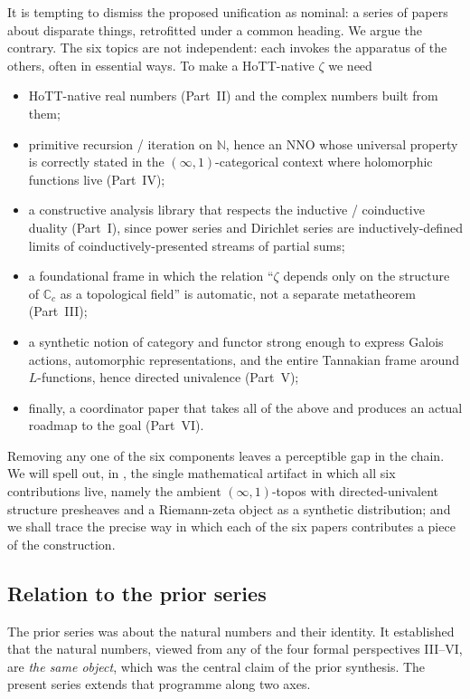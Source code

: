 \documentclass[12pt]{article}
\theoremstyle{definition}
\theoremstyle{remark}
\newcommand{\N}{\mathbb{N}}
\newcommand{\C}{\mathbb{C}}
\newcommand{\Cc}{\C_{c}}
\begin{document}
It is tempting to dismiss the proposed unification as nominal: a series of
papers about disparate things, retrofitted under a common heading. We argue
the contrary. The six topics are not independent: each invokes the
apparatus of the others, often in essential ways. To make a HoTT-native
$\zeta$ we need
\begin{itemize}[leftmargin=*]
\item HoTT-native real numbers (Part~II) and the complex numbers built from
      them;
\item primitive recursion / iteration on $\N$, hence an NNO whose universal
      property is correctly stated in the $(\infty,1)$-categorical context
      where holomorphic functions live (Part~IV);
\item a constructive analysis library that respects the inductive /
      coinductive duality (Part~I), since power series and Dirichlet series
      are inductively-defined limits of coinductively-presented streams of
      partial sums;
\item a foundational frame in which the relation
      ``$\zeta$ depends only on the structure of $\Cc$ as a topological
      field'' is automatic, not a separate metatheorem (Part~III);
\item a synthetic notion of category and functor strong enough to express
      Galois actions, automorphic representations, and the entire
      Tannakian frame around $L$-functions, hence directed univalence
      (Part~V);
\item finally, a coordinator paper that takes all of the above and produces
      an actual roadmap to the goal (Part~VI).
\end{itemize}
Removing any one of the six components leaves a perceptible gap in the
chain. We will spell out, in , the single
mathematical artifact in which all six contributions live, namely the
ambient $(\infty,1)$-topos with directed-univalent structure presheaves
and a Riemann-zeta object as a synthetic distribution; and we shall trace
the precise way in which each of the six papers contributes a piece of
the construction.

\subsection{Relation to the prior series}

The prior series \cite{paperI,paperII,paperIII,paperIV,paperV,paperVI,priorSynthesis}
was about the natural numbers and their identity. It established that the
natural numbers, viewed from any of the four formal perspectives III--VI,
are \emph{the same object}, which was the central claim of the prior
synthesis. The present series extends that programme along two axes.
\end{document}
